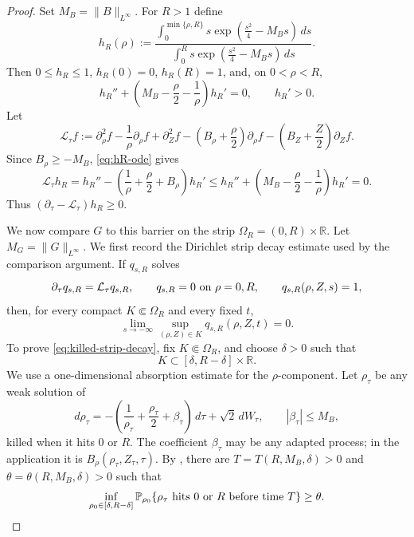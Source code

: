\documentclass[11pt]{amsart}
\numberwithin{equation}{section}
\theoremstyle{plain}
\theoremstyle{definition}
\theoremstyle{remark}
\begin{document}
\begin{proof}
Set \(M_B=\|B\|_{L^\infty}\).  For \(R>1\) define
\begin{equation}\label{eq:radial-barrier}
   h_R(\rho)
   :=
   \frac{\displaystyle\int_0^{\min\{\rho,R\}} s
      \exp\left(\frac{s^2}{4}-M_Bs\right)\,ds}
   {\displaystyle\int_0^R s
      \exp\left(\frac{s^2}{4}-M_Bs\right)\,ds} .
\end{equation}
Then \(0\le h_R\le1\), \(h_R(0)=0\), \(h_R(R)=1\), and, on
\(0<\rho<R\),
\begin{equation}\label{eq:hR-ode}
   h_R''+\left(M_B-\frac\rho2-\frac1\rho\right)h_R'=0,
   \qquad h_R'>0 .
\end{equation}
Let
\[
   \mathcal L_\tau f
   :=
   \partial_\rho^2f-\frac1\rho\partial_\rho f+\partial_Z^2f
   -\left(B_\rho+\frac\rho2\right)\partial_\rho f
   -\left(B_Z+\frac Z2\right)\partial_Z f .
\]
Since \(B_\rho\ge -M_B\), \eqref{eq:hR-ode} gives
\begin{equation}\label{eq:hR-superharmonic}
   \mathcal L_\tau h_R
   =h_R''-\left(\frac1\rho+\frac\rho2+B_\rho\right)h_R'
   \le
   h_R''+\left(M_B-\frac\rho2-\frac1\rho\right)h_R'
   =0 .
\end{equation}
Thus \((\partial_\tau-\mathcal L_\tau)h_R\ge0\).

We now compare \(G\) to this barrier on the strip
\(\Omega_R=(0,R)\times\mathbb R\).  Let
\(M_G=\|G\|_{L^\infty}\).  We first record the Dirichlet strip decay estimate used
by the comparison argument.  If \(q_{s,R}\) solves
\[
   \partial_\tau q_{s,R}=\mathcal L_\tau q_{s,R},
   \qquad q_{s,R}=0\hbox{ on }\rho=0,R,
   \qquad q_{s,R}(\rho,Z,s)=1,
\]
then, for every compact \(K\Subset\Omega_R\) and every fixed \(t\),
\begin{equation}\label{eq:killed-strip-decay}
   \lim_{s\to-\infty}\sup_{(\rho,Z)\in K}q_{s,R}(\rho,Z,t)=0 .
\end{equation}
To prove \eqref{eq:killed-strip-decay}, fix \(K\Subset\Omega_R\), and choose
\(\delta>0\) such that
\[
   K\subset[\delta,R-\delta]\times\mathbb R .
\]
We use a one-dimensional absorption estimate for the \(\rho\)-component.  Let
\(\rho_\tau\) be any weak solution of
\[
   d\rho_\tau
   =
   -\left(\frac1{\rho_\tau}+\frac{\rho_\tau}{2}
      +\beta_\tau\right)\,d\tau+\sqrt2\,dW_\tau,
   \qquad |\beta_\tau|\le M_B,
\]
killed when it hits \(0\) or \(R\).  The coefficient \(\beta_\tau\) may be any
adapted process; in the application it is
\(B_\rho(\rho_\tau,Z_\tau,\tau)\).  By
, there are
\(T=T(R,M_B,\delta)>0\) and \(\theta=\theta(R,M_B,\delta)>0\) such that
\[
   \inf_{\rho_0\in[\delta,R-\delta]}
   \mathbb P_{\rho_0}\{\rho_\tau\hbox{ hits }0\hbox{ or }R
      \hbox{ before time }T\}\ge\theta .
\]


\end{proof}
\end{document}
